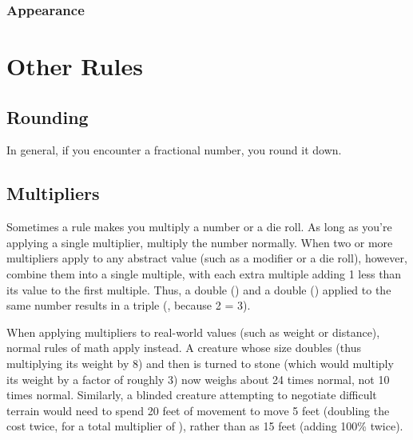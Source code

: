 \subsubsection{Appearance}

\section{Other Rules}

\subsection{Rounding}
In general, if you encounter a fractional number, you round it down.

\subsection{Multipliers}
Sometimes a rule makes you multiply a number or a die roll.
As long as you're applying a single multiplier, multiply the number normally.
When two or more multipliers apply to any abstract value (such as a modifier or a die roll), however, combine them into a single multiple, with each extra multiple adding 1 less than its value to the first multiple.
Thus, a double () and a double () applied to the same number results in a triple (, because 2  = 3).

When applying multipliers to real-world values (such as weight or distance), normal rules of math apply instead.
A creature whose size doubles (thus multiplying its weight by 8) and then is turned to stone (which would multiply its weight by a factor of roughly 3) now weighs about 24 times normal, not 10 times normal.
Similarly, a blinded creature attempting to negotiate difficult terrain would need to spend 20 feet of movement to move 5 feet (doubling the cost twice, for a total multiplier of ), rather than as 15 feet (adding 100\% twice).
